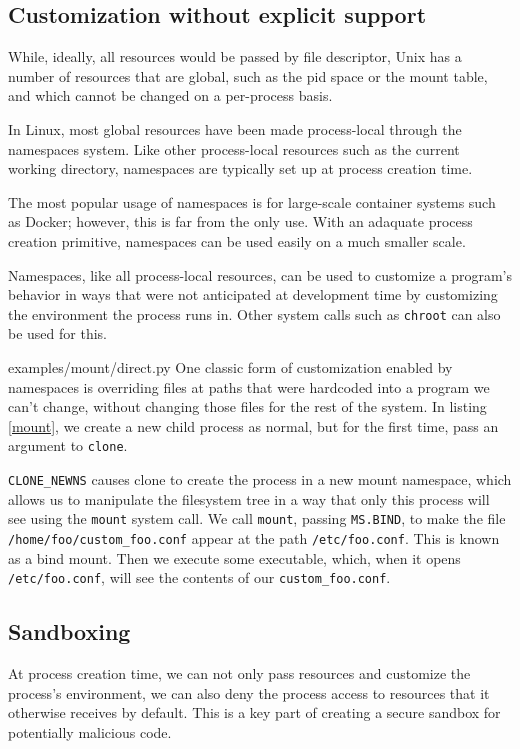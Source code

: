 \documentclass[letterpaper,twocolumn,10pt]{article}
\begin{document}
\subsection{Customization without explicit support}
While, ideally, all resources would be passed by file descriptor\cite{capsicum},
Unix has a number of resources that are global,
such as the pid space or the mount table,
and which cannot be changed on a per-process basis.

In Linux, most global resources have been made process-local
through the namespaces system.
Like other process-local resources such as the current working directory,
namespaces are typically set up at process creation time.

The most popular usage of namespaces is for large-scale container systems such as Docker;
however, this is far from the only use.
With an adaquate process creation primitive,
namespaces can be used easily on a much smaller scale.

Namespaces, like all process-local resources,
can be used to customize a program's behavior
in ways that were not anticipated at development time
by customizing the environment the process runs in.
Other system calls such as \texttt{chroot} can also be used for this.


{examples/mount/direct.py}
One classic form of customization enabled by namespaces
is overriding files at paths that were hardcoded into a program we can't change,
without changing those files for the rest of the system.
In listing \ref{mount},
we create a new child process as normal,
but for the first time,
pass an argument to \texttt{clone}.

\verb|CLONE_NEWNS| causes clone to create the process in a new mount namespace,
which allows us to manipulate the filesystem tree in a way that only this process will see
using the \texttt{mount} system call.
We call \texttt{mount}, passing \texttt{MS.BIND}, to make the file \verb|/home/foo/custom_foo.conf|
appear at the path \verb|/etc/foo.conf|.
This is known as a bind mount.
Then we execute some executable,
which, when it opens \verb|/etc/foo.conf|, will see the contents of our \verb|custom_foo.conf|.
\subsection{Sandboxing}
At process creation time,
we can not only pass resources and customize the process's environment,
we can also deny the process access to resources that it otherwise receives by default.
This is a key part of creating a secure sandbox for potentially malicious code.
\end{document}
